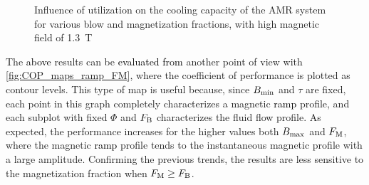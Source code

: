 \documentclass[referee]{svjour3}
\newcommand{\bmax}{\ensuremath{{B}\ped{max}}}
\newcommand{\bmin}{\ensuremath{{B}\ped{min}}}
\begin{document}
\begin{figure}[!ht]
  \centering
\quad
  \caption{Influence of utilization on the cooling capacity of the AMR system for  various blow and magnetization fractions, with high magnetic field of \SI{1.3}{\tesla}}
  \label{fig:Qc_curves_ramp_phi}
\end{figure}

The \textcolor{black}{above} results can be \textcolor{black}{evaluated from} another point of view with \autoref{fig:COP_maps_ramp_FM}, where the coefficient of performance is plotted as contour levels. This type of map is useful because, since $\bmin$ and $\tau$ are fixed, each point in this graph completely characterizes a magnetic \textcolor{black}{ramp} profile, and each subplot with fixed $\Phi$ and $F_{\mathrm{B}}$ characterizes the fluid flow profile. As expected, the performance increases for the higher values both $\bmax$ and $F_{\mathrm{M}}$, where the  magnetic \textcolor{black}{ramp} profile tends to the instantaneous magnetic profile with a large amplitude. Confirming the previous trends, the results are less sensitive to the magnetization fraction when $F_{\mathrm{M}} \ge F_{\mathrm{B}}$. 
\end{document}
